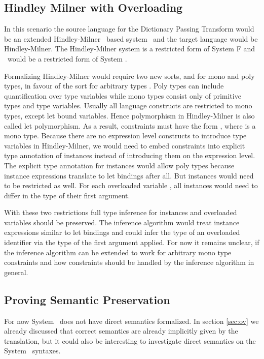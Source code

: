 \subsection{Hindley Milner with Overloading}\label{sec:hm}
In this scenario the source language for the Dictionary Passing Transform would be an extended Hindley-Milner~\cite{hm} based system \HMo\ and the target language would be Hindley-Milner. 
The Hindley-Milner system is a restricted form of System F and \HMo\ would be a restricted form of System \Fo. 

\noindent Formalizing Hindley-Milner would require two new sorts,  and  for mono and poly types, in favour of the sort for arbitrary types . 
Poly types can include quantification over type variables while mono types consist only of primitive types and type variables. 
Usually all language constructs are restricted to mono types, except let bound variables. 
Hence polymorphism in Hindley-Milner is also called let polymorphism.  
As a result, constraints must have the form  \Constr{:} , where  is a mono type. 
Because there are no expression level constructs to introduce type variables in Hindley-Milner, we would need to embed constraints into explicit type annotation of instances instead of introducing them on the expression level. 
The explicit type annotation for instances would allow poly types because instance expressions translate to let bindings after all.
But instances would need to be restricted as well. 
For each overloaded variable , all instances would need to differ in the type of their first argument.

\noindent With these two restrictions full type inference for instances and overloaded variables should be preserved.
The inference algorithm would treat instance expressions similar to let bindings and could infer the type of an overloaded identifier via the type of the first argument applied. 
For now it remains unclear, if the inference algorithm can be extended to work for arbitrary mono type constraints and how constraints should be handled by the inference algorithm in general.

\subsection{Proving Semantic Preservation}
For now System \Fo\ does not have direct semantics formalized. In section \ref{sec:ov} we already discussed that correct semantics are already implicitly given by the translation, but it could also be interesting to investigate direct semantics on the System \Fo\ syntaxes.

